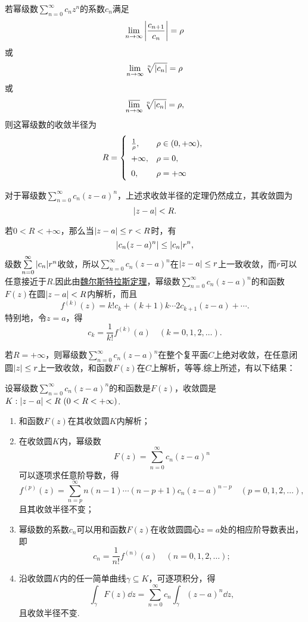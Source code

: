 \begin{theorem}\label{theorem:解析函数的级数表示.复幂级数的收敛半径的求法}
若幂级数\(\sum\limits_{n=0}^\infty c_n z^n\)的系数\(c_n\)满足\[
\lim\limits_{n\to\infty} \abs{\frac{c_{n+1}}{c_n}} = \rho
\]或\[
\lim\limits_{n\to\infty} \sqrt[n]{\abs{c_n}} = \rho
\]或\[
\varlimsup\limits_{n\to\infty} \sqrt[n]{\abs{c_n}} = \rho,
\]则这幂级数的收敛半径为\[
\def\arraystretch{1.5}
R = \left\{ \begin{array}{ll}
\frac{1}{\rho}, & \rho \in (0,+\infty), \\
+\infty, & \rho = 0, \\
0, & \rho = +\infty \\
\end{array} \right.
\]
\end{theorem}
对于幂级数\(\sum\limits_{n=0}^\infty c_n (z-a)^n\)，上述求收敛半径的定理仍然成立，其收敛圆为\[
\abs{z-a}<R.
\]

若\(0<R<+\infty\)，那么当\(\abs{z-a} \leq r < R\)时，有\[
\abs{c_n (z-a)^n} \leq \abs{c_n} r^n,
\]级数\(\sum\limits_{n=0}^\infty \abs{c_n} r^n\)收敛，所以\(\sum\limits_{n=0}^\infty c_n (z-a)^n\)在\(\abs{z-a} \leq r\)上一致收敛，而\(r\)可以任意接近于\(R\).因此由\hyperref[theorem:解析函数的级数表示.魏尔斯特拉斯定理]{魏尔斯特拉斯定理}，幂级数\(\sum\limits_{n=0}^\infty c_n (z-a)^n\)的和函数\(F(z)\)在圆\(\abs{z-a}<R\)内解析，而且\[
f^{(k)}(z) = k! c_k + (k+1)k\dotsm2c_{k+1}(z-a)+\dotsb.
\]特别地，令\(z=a\)，得\[
c_k = \frac{1}{k!} f^{(k)}(a)
\quad(k=0,1,2,\dotsc).
\]

若\(R=+\infty\)，则幂级数\(\sum\limits_{n=0}^\infty c_n (z-a)^n\)在整个复平面\(C\)上绝对收敛，在任意闭圆\(\abs{z} \leq r\)上一致收敛，和函数\(F(z)\)在\(C\)上解析，等等.综上所述，有以下结果：
\begin{theorem}\label{theorem:解析函数的级数表示.幂级数的和函数的性质}
设幂级数\(\sum\limits_{n=0}^\infty c_n (z-a)^n\)的和函数是\(F(z)\)，收敛圆是\(K: \abs{z-a}<R\ (0<R<+\infty)\).\begin{enumerate}
\item 和函数\(F(z)\)在其收敛圆\(K\)内解析；

\item 在收敛圆\(K\)内，幂级数\[
F(z) = \sum\limits_{n=0}^\infty c_n (z-a)^n
\]可以逐项求任意阶导数，得\begin{equation}
f^{(p)}(z) = \sum\limits_{n=p}^\infty n(n-1)\dotsm(n-p+1) c_n (z-a)^{n-p}
\quad(p=0,1,2,\dotsc),
\end{equation}且其收敛半径不变；

\item 幂级数的系数\(c_n\)可以用和函数\(F(z)\)在收敛圆圆心\(z=a\)处的相应阶导数表出，即\begin{equation}
c_n = \frac{1}{n!} f^{(n)}(a)
\quad(n=0,1,2,\dotsc);
\end{equation}

\item 沿收敛圆\(K\)内的任一简单曲线\(\gamma \subseteq K\)，可逐项积分，得\begin{equation}
\int_{\gamma} F(z) \dd{z}
= \sum\limits_{n=0}^\infty c_n \int_{\gamma} (z-a)^n \dd{z},
\end{equation}且收敛半径不变.
\end{enumerate}
\end{theorem}


